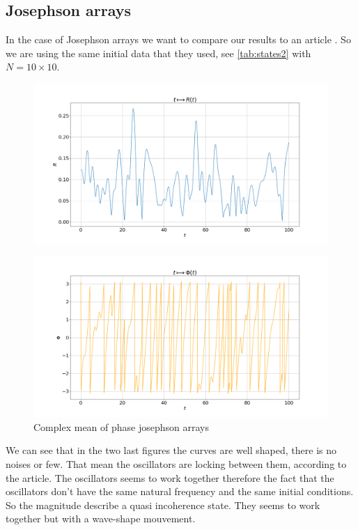 \documentclass[1pt, a4paper]{article}
\begin{document}
\subsection{Josephson arrays}
\label{subs:josephson}
In the case of Josephson arrays we want to compare our results to an article \cite{josephson}. So we are using the same initial data that they used, see \autoref{tab:states2} with $N=10\times10$.
\begin{figure}[htbp]
    \centering
    \includegraphics[width=.95\linewidth]{../outcomes/josephson/mag.png}
    \caption{}
    \label{fig:mag_j}
\end{figure}
\newpage
\begin{figure}[htbp]
    \centering
    \includegraphics[width=.95\linewidth]{../outcomes/josephson/phase.png}
    \caption{Complex mean of phase josephson arrays}
    \label{fig:phase_j}
\end{figure}
\noindent
We can see that in the two last figures the curves are well shaped, there is no noises or few. That mean the oscillators are locking between them, according to the article. The oscillators seems to work together therefore the fact that the oscillators don't have the same natural frequency and the same initial conditions. So the magnitude describe a quasi incoherence state. They seems to work together but with a wave-shape mouvement.
\end{document}

